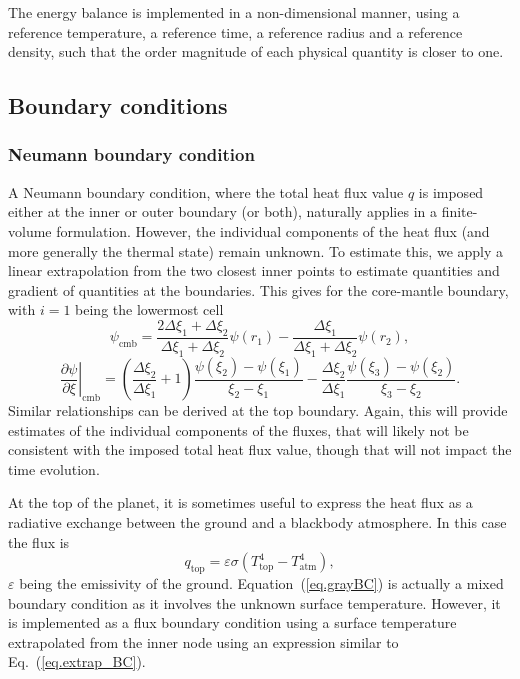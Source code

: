\documentclass{article}
\begin{document}
The energy balance is implemented in a non-dimensional manner, using a reference temperature, a reference time, a reference radius and a reference density, such that the order magnitude of each physical quantity is closer to one.

\subsection{Boundary conditions}

\subsubsection{Neumann boundary condition}

A Neumann boundary condition, where the total heat flux value $q$ is imposed either at the inner or outer boundary (or both), naturally applies in a finite-volume formulation. However, the individual components of the heat flux (and more generally the thermal state) remain unknown. To estimate this, we apply a linear extrapolation from the two closest inner points to estimate quantities and gradient of quantities at the boundaries. This gives for the core-mantle boundary, with $i=1$ being the lowermost cell
\begin{equation}
    \psi_\mathrm{cmb} = \frac{2\Delta\xi_1+\Delta\xi_2}{\Delta\xi_1+\Delta\xi_2}\psi(r_1) - \frac{\Delta\xi_1}{\Delta\xi_1+\Delta\xi_2}\psi(r_2),
    \label{eq.extrap_BC}
\end{equation}
\begin{equation}
        \left.\frac{\partial \psi}{\partial \xi}\right|_\mathrm{cmb}=\left(\frac{\Delta\xi_2}{\Delta\xi_1}+1\right)\frac{\psi(\xi_2)-\psi(\xi_1)}{\xi_2-\xi_1} - \frac{\Delta\xi_2}{\Delta\xi_1}\frac{\psi(\xi_3)-\psi(\xi_2)}{\xi_3-\xi_2}.
        \label{eq.extrap_grad_BC}
\end{equation}
Similar relationships can be derived at the top boundary. Again, this will provide estimates of the individual components of the fluxes, that will likely not be consistent with the imposed total heat flux value, though that will not impact the time evolution.

At the top of the planet, it is sometimes useful to express the heat flux as a radiative exchange between the ground and a blackbody atmosphere. In this case the flux is
\begin{equation}
    q_\mathrm{top} = \varepsilon \sigma (T_\mathrm{top}^4 - T_\mathrm{atm}^4),
\label{eq.grayBC}
\end{equation}
$\varepsilon$ being the emissivity of the ground. Equation~(\ref{eq.grayBC}) is actually a mixed boundary condition as it involves the unknown surface temperature. However, it is implemented as a flux boundary condition using a surface temperature extrapolated from the inner node using an expression similar to Eq.~(\ref{eq.extrap_BC}).
\end{document}
